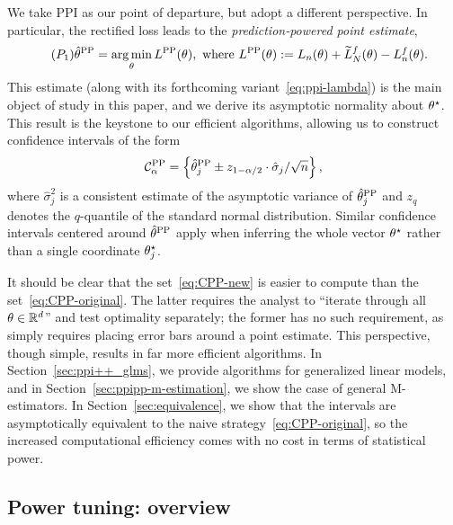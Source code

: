 We take PPI as our point of departure, but adopt a different perspective. In particular, the
rectified loss leads to the \emph{prediction-powered point estimate},
\begin{align}
  \label{eq:ppi}
  \tag{$P_1$}
  \hat{\theta}^{\mathrm{PP}} &=\operatorname*{arg\,min}_\theta L^{\mathrm{PP}}(\theta), \text{ where } L^{\mathrm{PP}}(\theta) := L_n(\theta) + \widetilde L^f_N(\theta)  - L_n^f(\theta).
\end{align}
This estimate (along with its forthcoming variant~\eqref{eq:ppi-lambda}) is the
main object of study in this paper, and we derive its asymptotic normality
about $\theta^\star$.  This result is the keystone to our efficient
\ppipp algorithms, allowing us to construct confidence intervals of the form
\begin{equation}
  \label{eq:CPP-new}
  \mathcal{C}^{\mathrm{PP}}_{\alpha} = \left\{\hat{\theta}^{\mathrm{PP}}_j \pm z_{1-\alpha/2} \cdot \hat\sigma_j / \sqrt{n} \right\},
\end{equation}
where $\hat\sigma_j^2$ is a consistent estimate of the
asymptotic variance of $\hat{\theta}^{\mathrm{PP}}_j$ and $z_{q}$ denotes the
$q$-quantile of the standard normal distribution. Similar confidence intervals centered around $\hat{\theta}^{\mathrm{PP}}$ apply when inferring the whole vector $\theta^\star$ rather than a single coordinate $\theta^\star_j$.

It should be clear that the set~\eqref{eq:CPP-new} is easier to compute than the set~\eqref{eq:CPP-original}.
The latter requires the analyst to ``iterate through all $\theta \in \mathbb{R}^d$'' and test
optimality separately; the former has no such requirement, as \ppipp
simply requires placing error bars around a point estimate.  
This perspective, though simple, results in far more efficient algorithms.
In Section~\ref{sec:ppi++_glms}, we provide algorithms for generalized linear models, and in Section~\ref{sec:ppipp-m-estimation}, we show the case of general M-estimators. 
In Section~\ref{sec:equivalence}, we show that the \ppipp intervals are asymptotically equivalent to the naive strategy~\eqref{eq:CPP-original}, so the increased computational efficiency comes with no cost in terms of statistical power.

\subsection{Power tuning: overview}

